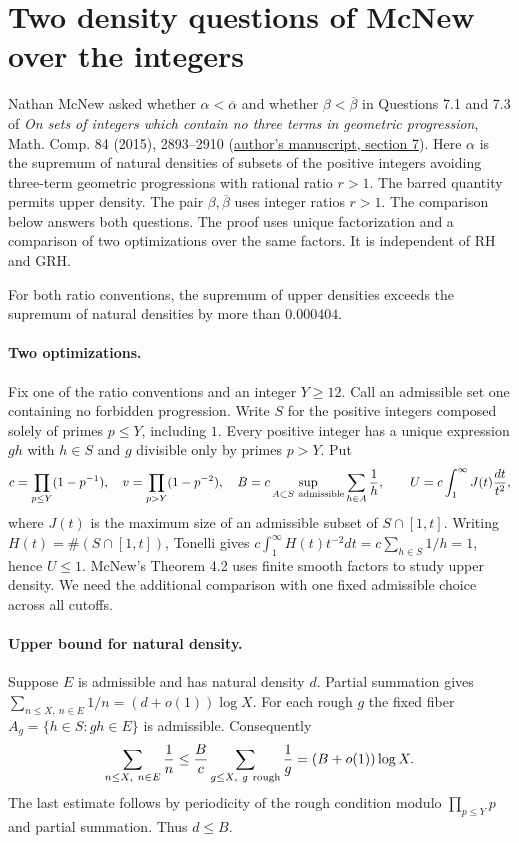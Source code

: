 \section{Two density questions of McNew over the integers}
Nathan McNew asked whether $\alpha<\overline\alpha$ and whether $\beta<\overline\beta$ in Questions 7.1 and 7.3 of \emph{On sets of integers which contain no three terms in geometric progression}, Math. Comp. 84 (2015), 2893--2910 (\href{https://www.nathanmcnew.com/GPFsets.pdf}{author's manuscript, section 7}). Here $\alpha$ is the supremum of natural densities of subsets of the positive integers avoiding three-term geometric progressions with rational ratio $r>1$. The barred quantity permits upper density. The pair $\beta,\overline\beta$ uses integer ratios $r>1$. The comparison below answers both questions. The proof uses unique factorization and a comparison of two optimizations over the same factors. It is independent of RH and GRH.

\begin{theorem}\label{th:integer-gap}
For both ratio conventions, the supremum of upper densities exceeds the supremum of natural densities by more than $0.000404$.
\end{theorem}

\paragraph{Two optimizations.}
Fix one of the ratio conventions and an integer $Y\ge 12$. Call an admissible set one containing no forbidden progression. Write $S$ for the positive integers composed solely of primes $p\le Y$, including $1$. Every positive integer has a unique expression $gh$ with $h\in S$ and $g$ divisible only by primes $p>Y$. Put
\[
 c=\prod_{p\le Y}(1-p^{-1}),\quad v=\prod_{p>Y}(1-p^{-2}),\quad
 B=c\sup_{A\subset S\ {\rm admissible}}\sum_{h\in A}\frac1h,\qquad
 U=c\int_1^\infty J(t)\frac{dt}{t^2},
\]
where $J(t)$ is the maximum size of an admissible subset of $S\cap[1,t]$. Writing $H(t)=\#(S\cap[1,t])$, Tonelli gives $c\int_1^\infty H(t)t^{-2}dt=c\sum_{h\in S}1/h=1$, hence $U\le1$. McNew's Theorem 4.2 uses finite smooth factors to study upper density. We need the additional comparison with one fixed admissible choice across all cutoffs.

\paragraph{Upper bound for natural density.}
Suppose $E$ is admissible and has natural density $d$. Partial summation gives $\sum_{n\le X,\ n\in E}1/n=(d+o(1))\log X$. For each rough $g$ the fixed fiber $A_g=\{h\in S:gh\in E\}$ is admissible. Consequently
\[
 \sum_{n\le X,\ n\in E}\frac1n\le\frac{B}{c}
           \sum_{g\le X,\ g\ {\rm rough}}\frac1g=(B+o(1))\log X.
\]
The last estimate follows by periodicity of the rough condition modulo $\prod_{p\le Y}p$ and partial summation. Thus $d\le B$.

